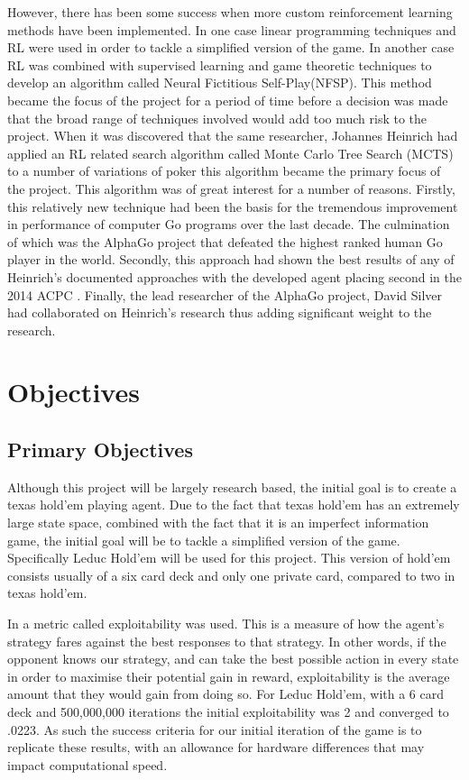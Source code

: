 However, there has been some success when more custom reinforcement learning methods have been implemented.
In one case linear programming techniques and RL were used in order to tackle a
simplified version of the game\citep{dahl2001reinforcement}.
In another case RL was combined with supervised learning and game theoretic
techniques\citep{heinrich2016deep} to develop an algorithm called Neural Fictitious Self-Play(NFSP).
This method became the focus of the project for a period of time before a decision was made
that the broad range of techniques involved would add too much risk to the project.
When it was discovered that the same researcher, Johannes Heinrich had applied an RL related search
algorithm called Monte Carlo Tree Search (MCTS) to a number of variations of poker\citep{heinrich2015smooth}
this algorithm became the primary focus of the project.
This algorithm was of great interest for a number of reasons.
Firstly, this relatively new technique had been the basis for the tremendous improvement
in performance of computer Go programs over the last decade.
The culmination of which was the AlphaGo project that defeated the highest ranked human Go player
in the world\citep{silver2016mastering}.
Secondly, this approach had shown the best results of any of Heinrich's documented approaches
with the developed agent placing second in the 2014 ACPC .
Finally, the lead researcher of the AlphaGo project, David Silver had collaborated on Heinrich's
research thus adding significant weight to the research.


\section{Objectives}\label{sec:objectives}
\subsection{Primary Objectives}\label{subsec:primaryObjectives}

Although this project will be largely research based, the initial goal is to create a texas hold'em
playing agent.
Due to the fact that texas hold'em has an extremely large state space, combined with the fact that it
is an imperfect information game, the initial goal will be to tackle a simplified version of the game.
Specifically Leduc Hold'em will be used for this project.
This version of hold'em consists usually of a six card deck and only one private card, compared to two in texas hold'em.

In\citep{heinrich2015smooth} a metric called exploitability was used.
This is a measure of how the agent's strategy fares against the best responses to that strategy.
In other words, if the opponent knows our strategy, and can take the best possible action
in every state in order to maximise their potential gain in reward, exploitability is the
average amount that they would gain from doing so.
For Leduc Hold'em, with a 6 card deck and 500,000,000 iterations the initial exploitability was 2 and converged
to .0223.
As such the success criteria for our initial iteration of the game is to replicate these results, with an
allowance for hardware differences that may impact computational speed.

